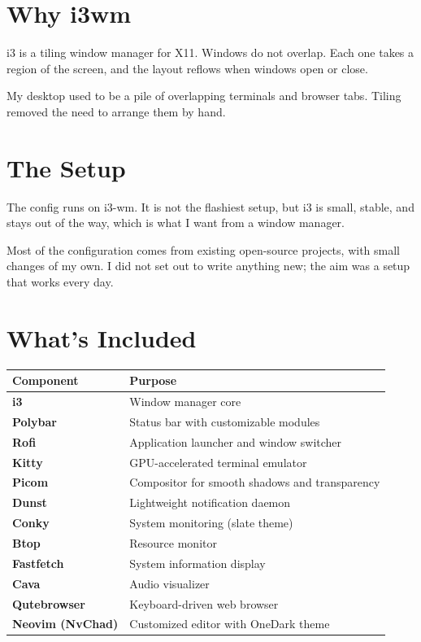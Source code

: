\section{Why i3wm}

i3 is a tiling window manager for X11. Windows do not overlap. Each one takes a region of the screen, and the layout reflows when windows open or close.

My desktop used to be a pile of overlapping terminals and browser tabs. Tiling removed the need to arrange them by hand.

\section{The Setup}

The config runs on i3-wm. It is not the flashiest setup, but i3 is small, stable, and stays out of the way, which is what I want from a window manager.

Most of the configuration comes from existing open-source projects, with small changes of my own. I did not set out to write anything new; the aim was a setup that works every day.

\section{What's Included}

\begin{center}
\begin{tabular}{ll}
\toprule
Component & Purpose \\
\midrule
\textbf{i3} & Window manager core \\
\textbf{Polybar} & Status bar with customizable modules \\
\textbf{Rofi} & Application launcher and window switcher \\
\textbf{Kitty} & GPU-accelerated terminal emulator \\
\textbf{Picom} & Compositor for smooth shadows and transparency \\
\textbf{Dunst} & Lightweight notification daemon \\
\textbf{Conky} & System monitoring (slate theme) \\
\textbf{Btop} & Resource monitor \\
\textbf{Fastfetch} & System information display \\
\textbf{Cava} & Audio visualizer \\
\textbf{Qutebrowser} & Keyboard-driven web browser \\
\textbf{Neovim (NvChad)} & Customized editor with OneDark theme \\
\bottomrule
\end{tabular}
\end{center}

